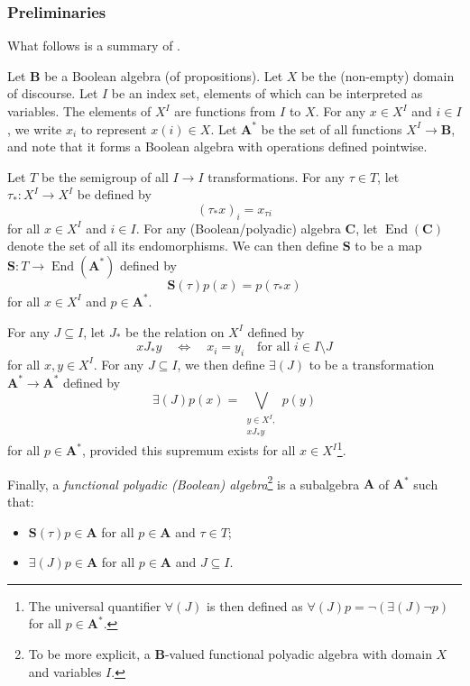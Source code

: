 \documentclass{article}
\theoremstyle{definition}
\theoremstyle{remark}
\DeclareMathOperator{\End}{End}
\begin{document}
\subsubsection{Preliminaries}

What follows is a summary of \cite{halmos2016algebraic}.

Let $\mathbf{B}$ be a Boolean algebra (of propositions). Let $X$ be the
(non-empty) domain of discourse. Let $I$ be an index set, elements of which can
be interpreted as variables. The elements of $X^I$ are functions from $I$ to
$X$. For any $x \in X^I$ and $i \in I$, we write $x_i$ to represent $x(i) \in
X$. Let $\mathbf{A^*}$ be the set of all functions $X^I \to \mathbf{B}$, and
note that it forms a Boolean algebra with operations defined pointwise.

Let $T$ be the semigroup of all $I \to I$ transformations. For any $\tau \in
T$, let $\tau_* : X^I \to X^I$ be defined by
\[
  (\tau_* x)_i = x_{\tau i}
\]
for all $x \in X^I$ and $i \in I$. For any (Boolean/polyadic) algebra
$\mathbf{C}$, let $\End(\mathbf{C})$ denote the set of all its endomorphisms. We
can then define $\mathbf{S}$ to be a map $\mathbf{S} : T \to \End(\mathbf{A^*})$
defined by
\[
  \mathbf{S}(\tau)p(x) = p(\tau_* x)
\]
for all $x \in X^I$ and $p \in \mathbf{A^*}$.

For any $J \subseteq I$, let $J_*$ be the relation on $X^I$ defined by
\[
  xJ_*y \quad \iff \quad x_i = y_i \quad \text{for all } i \in I \setminus J
\]
for all $x, y \in X^I$. For any $J \subseteq I$, we then define $\bm\exists(J)$
to be a transformation $\mathbf{A^*} \to \mathbf{A^*}$ defined by
\[
  \bm\exists(J)p(x) = \bigvee_{\substack{y \in X^I,\\ xJ_*y}} p(y)
\]
for all $p \in \mathbf{A^*}$, provided this supremum exists for all $x \in
X^I$\footnote{The universal quantifier $\bm\forall(J)$ is then defined as
  $\bm\forall(J)p = \neg(\bm\exists(J)\neg p)$ for all $p \in \mathbf{A^*}$.}.

Finally, a \emph{functional polyadic (Boolean) algebra}\footnote{To be more
  explicit, a $\mathbf{B}$-valued functional polyadic algebra with domain $X$
  and variables $I$.} is a subalgebra
$\mathbf{A}$ of $\mathbf{A^*}$ such that:
\begin{itemize}
\item $\mathbf{S}(\tau)p \in \mathbf{A}$ for all $p \in \mathbf{A}$ and $\tau
  \in T$;
\item $\bm\exists(J)p \in \mathbf{A}$ for all $p \in \mathbf{A}$ and $J
  \subseteq I$.
\end{itemize}
\end{document}
